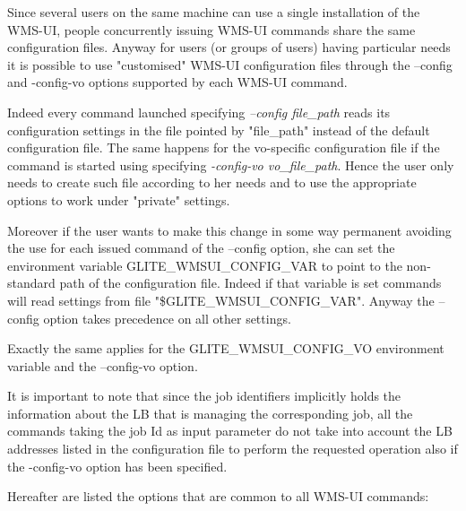 Since several users on the same machine can use a single installation of the WMS-UI, people concurrently issuing 
WMS-UI commands share the same configuration files. Anyway for users (or groups of users) having particular needs 
it is possible to use "customised" WMS-UI configuration files through the --config and -config-vo options supported 
by each WMS-UI command.

Indeed every command launched specifying \emph{--config file\_path} reads its configuration settings in the file 
pointed by "file\_path" instead of the default configuration file. The same happens for the vo-specific 
configuration file if the command is started using specifying  \emph{-config-vo vo\_file\_path}. 
Hence the user only needs to create such file according to her needs and to use the appropriate options to work 
under "private" settings.

Moreover if the user wants to make this change in some way permanent avoiding the use for each issued command 
of the --config option, she can set the environment variable GLITE\_WMSUI\_CONFIG\_VAR to point to the non-standard 
path of the configuration file. Indeed if that variable is set commands will read settings from file 
"\$GLITE\_WMSUI\_CONFIG\_VAR". Anyway the --config option takes precedence on all other settings.

Exactly the same applies for the GLITE\_WMSUI\_CONFIG\_VO environment variable and the --config-vo option.

It is important to note that since the job identifiers implicitly holds the information about the LB that is 
managing the corresponding job, all the commands taking the job Id as input parameter do not take into account 
the LB addresses listed in the configuration file to perform the requested operation also if the -config-vo option 
has been specified.

Hereafter are listed the options that are common to all WMS-UI commands: 

